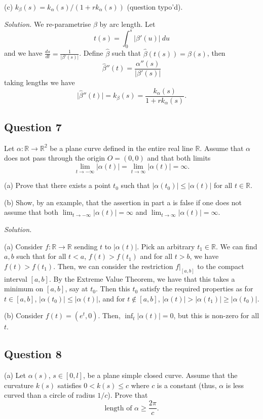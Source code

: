 \documentclass[12pt]{article}
\begin{document}
(c) \(k_\beta(s) = k_\alpha(s)/(1+r k_\alpha(s))\) (question typo'd).

\textit{Solution.}
We re-parametrise \(\beta\) by arc length.
Let \[t(s) = \int_0^s \lvert \beta'(u) \rvert\ du\]
and we have \(\frac{ds}{dt} = \frac{1}{\lvert \beta'(s)\rvert}\).
Define \(\hat{\beta}\) such that \(\hat{\beta}(t(s)) = \beta(s)\), then
\[\hat{\beta}''(t) = \frac{\alpha''(s)}{\lvert \beta'(s) \rvert} \]
taking lengths we have
\[\lvert \hat{\beta}''(t) \rvert = k_\beta(s) = \frac{k_\alpha(s)}{1 + rk_\alpha(s)}. \]

\subsection*{Question 7}

Let $\alpha : \mathbb R \to \mathbb R^2$ be a plane curve
defined in the entire real line $\mathbb R$.
Assume that $\alpha$ does not pass through
the origin $O = (0,0)$ and that both limits
$$\lim_{t\to -\infty} |\alpha(t)| = \lim_{t\to \infty} |\alpha(t)| = \infty.$$

(a) Prove that there exists a point $t_0$ such that $|\alpha(t_0)| \leq |\alpha(t)|$ for all $t \in \mathbb R.$

(b) Show, by an example, that the assertion in part a is false
if one does not assume that both $\lim_{t \to -\infty}|\alpha(t)| = \infty$ and $\lim_{t \to \infty}|\alpha(t)| = \infty$.

\textit{Solution.}

(a) Consider $f : \mathbb{R} \to \mathbb{R}$ sending $t$ to $|\alpha(t)|.$
Pick an arbitrary $t_1 \in \mathbb{R}$. We can find $a, b$ such that for all $t < a$,
$f(t) > f(t_1)$ and for all $t > b$, we have $f(t) > f(t_1).$ Then, we can consider
the restriction $f|_{[a,b]}$ to the compact interval $[a,b]$. By the Extreme Value Theorem,
we have that this takes a minimum on $[a, b]$, say at $t_0$. Then this $t_0$ satisfy the required properties
as for $t \in [a,b]$, $|\alpha(t_0)| \leq |\alpha(t)|$, and for $t \not \in [a,b]$, $|\alpha(t)| > |\alpha(t_1)| \geq |\alpha(t_0)|$.

(b) Consider $f(t) = (e^t, 0).$ Then, $\inf_t |\alpha(t)| = 0$, but this is non-zero for all $t$.

\subsection*{Question 8}

(a) Let \(\alpha(s)\), \(s\in[0,l]\), be a plane simple closed curve.
Assume that the curvature \(k(s)\) satisfies \(0<k(s)\leq c\) where \(c\) is a constant
(thus, \(\alpha\) is less curved than a circle of radius \(1/c\)). Prove that
\[ \text{length of }\alpha \geq \frac{2\pi}{c} . \]
\end{document}
